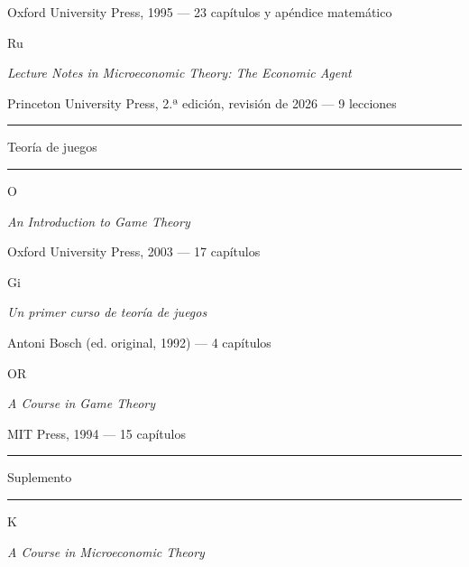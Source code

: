 \documentclass[11pt,a4paper]{article}
\newcommand{\etiqueta}[2]{%
  {\setlength{\fboxsep}{1.4pt}\colorbox{#1}{\sffamily\bfseries\color{white}\strut#2}}}
\begin{document}
\begin{titlepage}
{\small\color{tonoPizarra} Oxford University Press, 1995 --- 23 capítulos y apéndice matemático\par}
\vspace{0.25cm}
{\large\etiqueta{colorRu}{Ru} \par}
{\normalsize \emph{\color{colorRu}Lecture Notes in Microeconomic Theory: The Economic Agent}\par}
{\small\color{tonoPizarra} Princeton University Press, 2.ª edición, revisión de 2026 --- 9 lecciones\par}
\vspace{0.5cm}
{\sffamily\large\bfseries\color{tonoPrincipal}\textcolor{tonoClaro}{\rule[0.5ex]{1.5cm}{0.6pt}}\quad Teoría de juegos\quad\textcolor{tonoClaro}{\rule[0.5ex]{1.5cm}{0.6pt}}\par}
\vspace{0.3cm}
{\large\etiqueta{colorO}{O} \par}
{\normalsize \emph{\color{colorO}An Introduction to Game Theory}\par}
{\small\color{tonoPizarra} Oxford University Press, 2003 --- 17 capítulos\par}
\vspace{0.25cm}
{\large\etiqueta{colorGi}{Gi} \par}
{\normalsize \emph{\color{colorGi}Un primer curso de teoría de juegos}\par}
{\small\color{tonoPizarra} Antoni Bosch (ed. original, 1992) --- 4 capítulos\par}
\vspace{0.25cm}
{\large\etiqueta{colorOR}{OR} \par}
{\normalsize \emph{\color{colorOR}A Course in Game Theory}\par}
{\small\color{tonoPizarra} MIT Press, 1994 --- 15 capítulos\par}
\vspace{0.5cm}
{\sffamily\large\bfseries\color{tonoPrincipal}\textcolor{tonoClaro}{\rule[0.5ex]{1.5cm}{0.6pt}}\quad Suplemento\quad\textcolor{tonoClaro}{\rule[0.5ex]{1.5cm}{0.6pt}}\par}
\vspace{0.3cm}
{\large\etiqueta{colorK}{K} \par}
{\normalsize \emph{\color{colorK}A Course in Microeconomic Theory}\par}

\end{titlepage}
\end{document}
